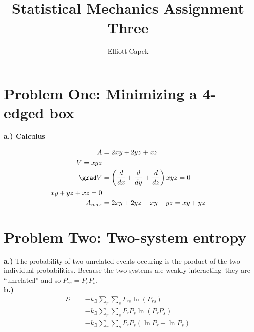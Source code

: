 \documentclass[10pt]{article} %
\title{Statistical Mechanics Assignment Three}
\author{Elliott Capek}
\begin{document}
\maketitle{}

\section{Problem One: Minimizing a 4-edged box}
\textbf{a.) Calculus}

\begin{align*}
  A &= 2xy + 2yz + xz\\
  V = xyz\\
  \grad V &= \left(\frac{d}{dx} + \frac{d}{dy} + \frac{d}{dz} \right)xyz = 0\\
  xy + yz + xz = 0\\
  A_{max} &= 2xy + 2yz - xy - yz = xy + yz\\
  
\end{align*}

\section{Problem Two: Two-system entropy}
\textbf{a.)} The probability of two unrelated events occuring is the product of the
two individual probabilities. Because the two systems are weakly interacting,
they are ``unrelated'' and so $P_{rs} = P_rP_s$.\\

\textbf{b.)}
\begin{align*}
  S &= -k_B\sum_r \sum_s P_{rs} \ln\left(P_{rs}\right)\\
  &= -k_B\sum_r \sum_s P_rP_s \ln\left(P_rP_s\right)\\
  &= -k_B\sum_r \sum_s P_rP_s\left(\ln P_r + \ln P_s\right)\\
\end{align*}
\end{document}
